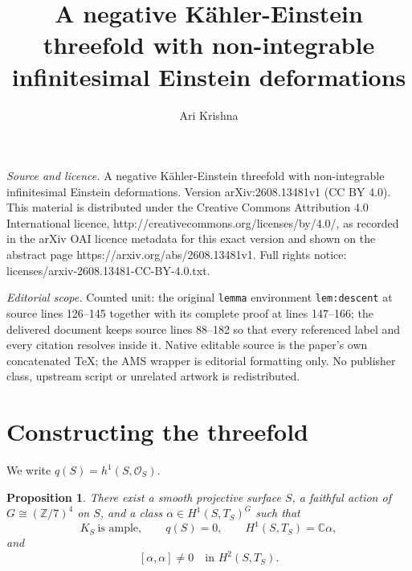 \documentclass[10pt,a4paper]{amsart}
\numberwithin{equation}{section}
\newtheorem{proposition}[theorem]{Proposition}
\newcommand{\C}{\mathbb{C}}
\newcommand{\Z}{\mathbb{Z}}
\newcommand{\cO}{\mathcal{O}}
\begin{document}
\title[A negative K"ahler-Einstein threefold with non-integrable in]{A negative K\"ahler-Einstein threefold with non-integrable infinitesimal Einstein deformations}
\author{Ari Krishna}
\date{}
\maketitle
\noindent\emph{Source and licence.} A negative K\"ahler-Einstein threefold with non-integrable infinitesimal Einstein deformations. Version arXiv:2608.13481v1 (CC BY 4.0). This material is distributed under the Creative Commons Attribution 4.0 International licence, http://creativecommons.org/licenses/by/4.0/, as recorded in the arXiv OAI licence metadata for this exact version and shown on the abstract page https://arxiv.org/abs/2608.13481v1. Full rights notice: licenses/arxiv-2608.13481-CC-BY-4.0.txt.\par\smallskip
\noindent\textit{Editorial scope.} Counted unit: the original \texttt{lemma} environment \texttt{lem:descent} at source lines 126--145 together with its complete proof at lines 147--166; the delivered document keeps source lines 88--182 so that every referenced label and every citation resolves inside it. Native editable source is the paper's own concatenated TeX; the AMS wrapper is editorial formatting only. No publisher class, upstream script or unrelated artwork is redistributed.
\section{Constructing the threefold}

We write $q(S)=h^1(S,\cO_S)$.

\begin{proposition}\label{prop:surface}
There exist a smooth projective surface $S$, a faithful action of $G\cong(\Z/7)^4$
on $S$, and a class $\alpha\in H^1(S,T_S)^G$ such that
$$K_S\ \text{is ample},\qquad q(S)=0,\qquad
H^1(S,T_S)=\C\alpha,$$
and
$$
[\alpha,\alpha]\neq0\quad\text{in }H^2(S,T_S).$$
\end{proposition}
\end{document}
